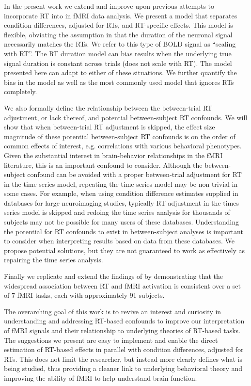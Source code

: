 \documentclass[titlepage,12pt] {article}
\begin{document}
In the present work we extend and improve upon previous attempts to incorporate RT into in fMRI data analysis.   We present a model that separates condition differences, adjusted for RTs, and RT-specific effects.  This model is flexible, obviating the assumption in \citet{grinband_detection_2008} that the duration of the neuronal signal necessarily matches the RTs.  We refer to this type of BOLD signal as ``scaling with RT''.  The RT duration model can bias results when the underlying true signal duration is constant across trials (does not scale with RT).  The model presented here can adapt to either of these situations.  We further quantify the bias in the \citet{grinband_detection_2008} model as well as the most commonly used model that ignores RTs completely.  

We also formally define the relationship between the between-trial RT adjustment, or lack thereof, and potential between-subject RT confounds.  We will show that when between-trial RT adjustment is skipped, the effect size magnitude of these potential between-subject RT confounds is on the order of common effects of interest,  e.g. correlations with various behavioral phenotypes.  Given the substantial interest in brain-behavior relationships in the fMRI literature, this is an important confound to consider.   Although the between-subject confound can be avoided with a proper between-trial adjustment for RT in the time series model, repeating the time series model may be non-trivial in some cases.  For example, when using condition difference estimates supplied in databases for large neuroimaging studies, typically RT adjustment in the times series model is skipped and redoing the time series analysis for thousands of subjects may not be possible for many users of these databases.  Understanding the potential for RT confounds to exist in between-subject analyses is important to consider when interpreting results based on data from these databases.  We propose potential solutions, but they are not guaranteed to work as effectively as repairing the time series analysis.

Finally we replicate and extend the findings of \citet{yarkoni_bold_2009} by demonstrating that the widespread association between RT and fMRI activation is consistent over a set of 7 fMRI tasks, each with approximately 91 subjects.  

The overarching goal of this work is to revive an interest and curiosity in understanding and addressing RT-based confounds to improve our interpretation of fMRI signals and their relationship to underlying theories of RT-based tasks. The suggestions we present are easy to implement and enable the direct estimation of RT-based effects in parallel with condition differences, adjusted for RTs.  This does not limit the researcher, but instead more clearly defines what is being studied, thus providing a cleaner link to underlying behavioral theory and improving the ability of fMRI to help understand brain function.
\end{document}
